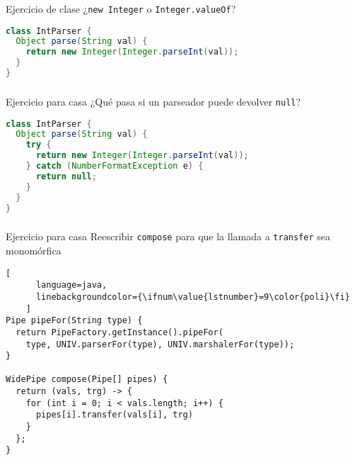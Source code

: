 \begin{frame}[fragile]
  \frametitle{\ft}
  \begin{block}{Ejercicio de clase}
    ¿{\tt new Integer} o {\tt Integer.valueOf}?
    \begin{lstlisting}[language=java]
class IntParser {
  Object parse(String val) {
    return new Integer(Integer.parseInt(val));
  }
}
    \end{lstlisting}
  \end{block}
\end{frame}


\begin{frame}[fragile]
  \frametitle{\ft}
  \begin{block}{Ejercicio para casa}
    ¿Qué pasa si un parseador puede devolver {\tt null}?
    \begin{lstlisting}[language=java]
class IntParser {
  Object parse(String val) {
    try {
      return new Integer(Integer.parseInt(val));
    } catch (NumberFormatException e) {
      return null;
    }
  }
}
    \end{lstlisting}
  \end{block}
\end{frame}


\begin{frame}[fragile]
  \frametitle{\ft}
  \begin{block}{Ejercicio para casa}
  Reescribir {\tt compose} para que la llamada a {\tt transfer} sea
  monomórfica
    \begin{lstlisting}[
      language=java,
      linebackgroundcolor={\ifnum\value{lstnumber}=9\color{poli}\fi}
    ]
Pipe pipeFor(String type) {
  return PipeFactory.getInstance().pipeFor(
    type, UNIV.parserFor(type), UNIV.marshalerFor(type));
}

WidePipe compose(Pipe[] pipes) {
  return (vals, trg) -> {
    for (int i = 0; i < vals.length; i++) {
      pipes[i].transfer(vals[i], trg)
    }
  };
}
    \end{lstlisting}
  \end{block}
\end{frame}
